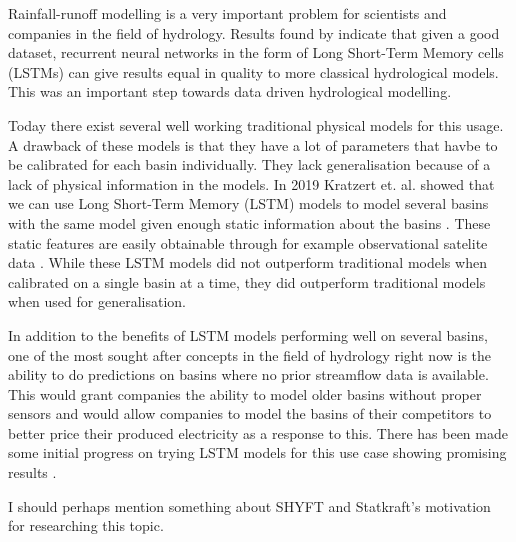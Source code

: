 Rainfall-runoff modelling is a very important problem for scientists and 
companies in the field of hydrology.
Results found by \citet{lstm_first_paper} indicate that given a good dataset,
recurrent neural networks in the form of Long Short-Term Memory cells (LSTMs)
can give results equal in quality to more classical hydrological models.
This was an important step towards data driven hydrological modelling. 

Today there exist several well working traditional physical models for this usage. \citationneeded
A drawback of these models is that they have a lot of parameters that havbe to be 
calibrated for each basin individually. They lack generalisation because of a lack of 
physical information in the models. \citationneeded In 2019 Kratzert et. al. showed
that we can use Long Short-Term Memory (LSTM) models to model several basins with the same model
given enough static information about the basins \citep{lstm_second_paper}. These 
static features are easily obtainable through for example observational satelite 
data \citep{CAMELS_US}. While these LSTM models did not outperform traditional models when calibrated on a single basin at 
a time, they did outperform traditional models when used for generalisation.

In addition to the benefits of LSTM models performing well on several basins, 
one of the most sought after concepts in the field of hydrology right now is the 
ability to do predictions on basins where no prior streamflow data is available. \citationneeded
This would grant companies the ability to model older basins without proper sensors
and would allow companies to model the basins of their competitors to better price 
their produced electricity as a response to this. There has been made some initial 
progress on trying LSTM models for this use case showing promising results \citep{lstm_third_paper}. 

I should perhaps mention something about SHYFT \citep{Shyft} and Statkraft's motivation for 
researching this topic.

